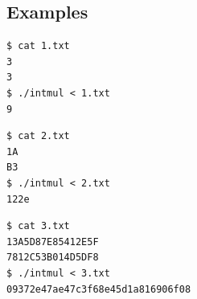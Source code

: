 \subsection*{Examples}
\begin{multicols}{3}
\begin{verbatim}
$ cat 1.txt
3
3
$ ./intmul < 1.txt
9
\end{verbatim}

\begin{verbatim}
$ cat 2.txt
1A
B3
$ ./intmul < 2.txt
122e
\end{verbatim}

\begin{verbatim}
$ cat 3.txt
13A5D87E85412E5F
7812C53B014D5DF8
$ ./intmul < 3.txt
09372e47ae47c3f68e45d1a816906f08
\end{verbatim}
\end{multicols}

\osueguidelinestwo


